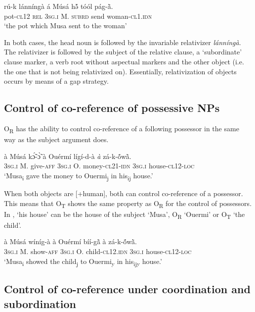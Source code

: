 \documentclass[output=paper]{langsci/langscibook}
\begin{document}
\ea
\label{ex:34.pacchiarotti}
\gll rú-k    lánníngà  á    Músá  hə̃́    tóól  pág-\`{ã}.\\
pot-\textsc{cl12}  \textsc{rel}    \textsc{3sg.i}    M.  \textsc{subrd}    send  woman-\textsc{cl1.idn}\\
\glt `the pot which Musa sent to the woman'
\z

In both cases, the head noun is followed by the invariable relativizer \textit{lánníngà}. The relativizer is followed by the subject of the relative clause, a `subordinate' clause marker, a verb root without aspectual markers and the other object (i.e. the one that is not being relativized on). Essentially, relativization of objects occurs by means of a gap strategy. 

\subsection{Control of co-reference of possessive NPs}\label{§5.2:Control.pacchiarotti}

O\textsubscript{R} has the ability to control co-reference of a following possessor in the same way as the subject argument does.

\ea
\label{ex:35.pacchiarotti}
\gll à Músá kɔ̃́-ɔ̃̀ à Ouérmí lígí-d-à \textit{à} zá-k-\'{õ}w\`{ã}.  \\
\textsc{3sg.i}  M.  give-\textsc{aff} \textsc{3sg.i} O. money-\textsc{cl21-idn} \textsc{3sg.i}  house-\textsc{cl12-loc}\\
\glt `Musa\textsubscript{i} gave the money to Ouermi\textsubscript{j} in his\textsubscript{ij} house.'
\z

When both objects are [+human], both can control co-reference of a possessor. This means that O\textsubscript{T} shows the same property as O\textsubscript{R} for the control of possessors. In , `his house' can be the house of the subject `Musa', O\textsubscript{R} `Ouermi' or O\textsubscript{T} `the child'.

\ea
\label{ex:36.pacchiarotti}
\gll à Músá wíníg-à à Ouérmí bíí-g\`{ã} à zá-k-\'{õ}w\`{ã}.  \\
\textsc{3sg.i}  M.  show-\textsc{aff} \textsc{3sg.i} O. child\textsc{-cl12.idn} \textsc{3sg.i} house-\textsc{cl12-loc}\\
\glt `Musa\textsubscript{i} showed the child\textsubscript{j} to Ouermi\textsubscript{y} in his\textsubscript{ijy} house.' 
\z

\subsection{Control of co-reference under coordination and subordination}\label{§5.3:control.pacchiarotti}
\end{document}
